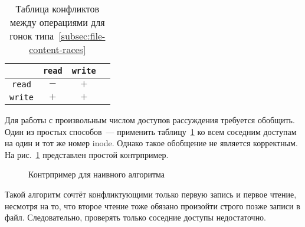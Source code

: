 \begin{table}[H]
    \centering
    \begin{tabular}{cccc}
        \toprule
        & \texttt{read} & \texttt{write} \\
        \midrule
        \texttt{read} & $-$ & $+$ \\
        \texttt{write} & $+$ & $+$ \\
        \bottomrule
    \end{tabular}
    \caption{Таблица конфликтов между операциями для гонок типа~\ref{subsec:file-content-races}}
    \label{tab:conflict-table}
\end{table}

Для работы с произвольным числом доступов рассуждения требуется обобщить. Один из простых способов~--- применить таблицу~\ref{tab:conflict-table} ко всем соседним доступам на один и тот же номер inode. Однако такое обобщение не является корректным. На рис.~\ref{fig:naive-conflict-break} представлен простой контрпример.

\begin{figure}[H]
    \centering
    \caption{Контрпример для наивного алгоритма}
    \label{fig:naive-conflict-break}
\end{figure}

Такой алгоритм сочтёт конфликтующими только первую запись и первое чтение, несмотря на то, что второе чтение тоже обязано произойти строго позже записи в файл. Следовательно, проверять только соседние доступы недостаточно.

